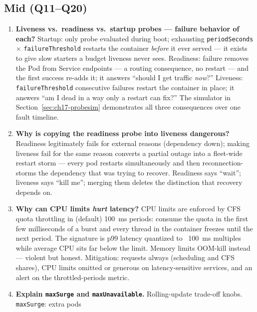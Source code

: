 \subsection*{Mid (Q11--Q20)}
\begin{enumerate}[label=\textbf{Q\arabic*.}, leftmargin=1.6cm, start=11]
  \item \textbf{Liveness vs.\ readiness vs.\ startup probes --- failure
        behavior of each?}
        Startup: only probe evaluated during boot; exhausting
        \texttt{periodSeconds} $\times$ \texttt{failureThreshold}
        restarts the container \emph{before} it ever served --- it exists
        to give slow starters a budget liveness never sees. Readiness:
        failure removes the Pod from Service endpoints --- a routing
        consequence, no restart --- and the first success re-adds it; it
        answers ``should I get traffic \emph{now}?'' Liveness:
        \texttt{failureThreshold} consecutive failures restart the
        container in place; it answers ``am I dead in a way only a
        restart can fix?'' The simulator in
        Section~\ref{sec:ch17-probesim} demonstrates all three
        consequences over one fault timeline.
  \item \textbf{Why is copying the readiness probe into liveness
        dangerous?}
        Readiness legitimately fails for external reasons (dependency
        down); making liveness fail for the same reason converts a
        partial outage into a fleet-wide restart storm --- every pod
        restarts simultaneously and then reconnection-storms the
        dependency that was trying to recover. Readiness says
        ``wait''; liveness says ``kill me''; merging them deletes the
        distinction that recovery depends on.
  \item \textbf{Why can CPU limits \emph{hurt} latency?}
        CPU limits are enforced by CFS quota throttling in (default)
        100~ms periods: consume the quota in the first few milliseconds
        of a burst and every thread in the container freezes until the
        next period. The signature is p99 latency quantized to ~100~ms
        multiples while average CPU sits far below the limit. Memory
        limits OOM-kill instead --- violent but honest. Mitigation:
        requests always (scheduling and CFS shares), CPU limits omitted
        or generous on latency-sensitive services, and an alert on the
        throttled-periods metric.
  \item \textbf{Explain \texttt{maxSurge} and \texttt{maxUnavailable}.}
        Rolling-update trade-off knobs. \texttt{maxSurge}: extra pods

\end{enumerate}
